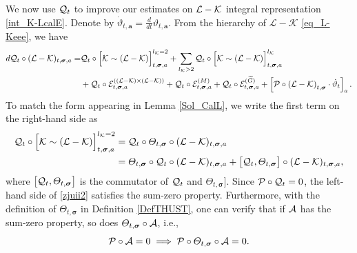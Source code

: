 \documentclass[10pt,reqno]{article}
\theoremstyle{plain} %
\theoremstyle{remark}
\numberwithin{equation}{section}
\begin{document}
We  now use  ${\cal Q}_t$ to improve our estimates on  ${\cal L} - {\cal K}$ integral representation \eqref{int_K-LcalE}.
Denote by $\dot \vartheta_{t,  \textbf{a}}=\frac{d}{dt}\vartheta_{t,  \textbf{a}}$. 
 From the hierarchy of \(\mathcal{L} - \mathcal{K}\) \eqref{eq_L-Keee}, we have 
\begin{align} \label{zjuii1}
    d{\cal Q}_t \circ (\mathcal{L} - \mathcal{K})_{t, \boldsymbol{\sigma}, \textbf{a}} 
    = & {\cal Q}_t \circ \Big[\mathcal{K} \sim (\mathcal{L} - \mathcal{K})\Big]^{l_\mathcal{K} = 2}_{t, \boldsymbol{\sigma}, \textbf{a}} 
    + \sum_{l_\mathcal{K} > 2} {\cal Q}_t \circ \Big[\mathcal{K} \sim (\mathcal{L} - \mathcal{K})\Big]^{l_\mathcal{K}}_{t, \boldsymbol{\sigma}, \textbf{a}} 
    \\\nonumber
    & + {\cal Q}_t \circ \mathcal{E}^{((\mathcal{L} - \mathcal{K}) \times (\mathcal{L} - \mathcal{K}))}_{t, \boldsymbol{\sigma}, \textbf{a}} 
    + {\cal Q}_t \circ \mathcal{E}^{(M)}_{t, \boldsymbol{\sigma}, \textbf{a}} 
    + {\cal Q}_t \circ \mathcal{E}^{(\widetilde{G})}_{t, \boldsymbol{\sigma}, \textbf{a}} 
    + \left[{\cal P} \circ \left(\mathcal{L} - \mathcal{K}\right)_{t, \boldsymbol{\sigma}} \cdot \dot \vartheta_t \right]_{\textbf{a}}.
\end{align} 
To  match the form appearing in Lemma \ref{Sol_CalL}, we write the first term on the right-hand side as 
\begin{align}\label{zjuii2}
{\cal Q}_t \circ \Big[\mathcal{K} \sim (\mathcal{L} - \mathcal{K})\Big]^{l_\mathcal{K} = 2}_{t, \boldsymbol{\sigma}, \textbf{a}}
& = {\cal Q}_t \circ \varTheta_{t, \boldsymbol{\sigma}} \circ (\mathcal{L} - \mathcal{K})_{t, \boldsymbol{\sigma}, \textbf{a}}
\\\nonumber
& = \varTheta_{t, \boldsymbol{\sigma}} \circ {\cal Q}_t \circ (\mathcal{L} - \mathcal{K})_{t, \boldsymbol{\sigma}, \textbf{a}}
+ \big[{\cal Q}_t , \varTheta_{t, \boldsymbol{\sigma}} \big] \circ (\mathcal{L} - \mathcal{K})_{t, \boldsymbol{\sigma}, \textbf{a}},
\end{align}
where  $\big[{\cal Q}_t , \varTheta_{t, \boldsymbol{\sigma}} \big] $ is the commutator
of ${\cal Q}_t $ and $\varTheta_{t, \boldsymbol{\sigma}} \big]$.
Since \({\cal P} \circ {\cal Q}_t = 0\), the left-hand side of \eqref{zjuii2} satisfies the sum-zero property. Furthermore, with the definition of \(\varTheta_{t, \boldsymbol{\sigma}} \) in Definition \ref{DefTHUST}, one can verify that if \({\cal A}\) has the sum-zero property,  so does \(\varTheta_{t, \boldsymbol{\sigma}}  \circ {\cal A}\), i.e., 
\[
{\cal P} \circ {\cal A} = 0 \implies {\cal P} \circ \varTheta_{t, \boldsymbol{\sigma}}  \circ {\cal A} = 0.
\]
\end{document}
